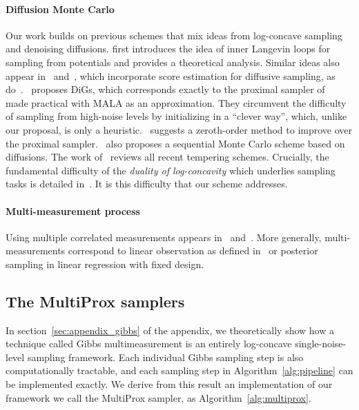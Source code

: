 \paragraph{Diffusion Monte Carlo} Our work builds on previous schemes that mix ideas from log-concave sampling and denoising diffusions.
\cite{huang_reverse_2024} first introduces the idea of inner Langevin loops for sampling from potentials and provides a theoretical analysis. Similar ideas also appear in~\cite{mcdonald_proposal_2022} and~\cite{vargas_denoising_2023}, which incorporate score estimation for diffusive sampling, as do~\cite{akhound-sadegh_iterated_2024}.~\cite{chen_diffusive_2024} proposes DiGs, which corresponds exactly to the proximal sampler of~\cite{shen_composite_2020} made practical with MALA as an approximation. They circumvent the difficulty of sampling from high-noise levels by initializing in a \enquote{clever way}, which, unlike our proposal, is only a heuristic.~\cite{he_zeroth-order_2024} suggests a zeroth-order method to improve over the proximal sampler.~\cite{phillips_particle_2024} also proposes a sequential Monte Carlo scheme based on diffusions. The work of~\cite{chehab_practical_2024} reviews all recent tempering schemes. Crucially, the fundamental difficulty of the \emph{duality of log-concavity} which underlies sampling tasks is detailed in~\cite{grenioux_stochastic_2024}. It is this difficulty that our scheme addresses.

\paragraph{Multi-measurement process} Using multiple correlated measurements appears in~\cite{saremi_multimeasurement_2022} and~\cite{saremi_chain_2024}. More generally, multi-measurements correspond to linear observation as defined in~\cite{montanari_posterior_2024} or posterior sampling in linear regression with fixed design.

\subsection{The MultiProx samplers}
In section~\ref{sec:appendix_gibbs} of the appendix, we theoretically show how a technique called Gibbs multimeasurement is an entirely log-concave single-noise-level sampling framework. Each individual Gibbs sampling step is also computationally tractable, and each sampling step in Algorithm~\ref{alg:pipeline} can be implemented exactly. We derive from this result an implementation of our framework we call the MultiProx sampler, as Algorithm~\ref{alg:multiprox}.

